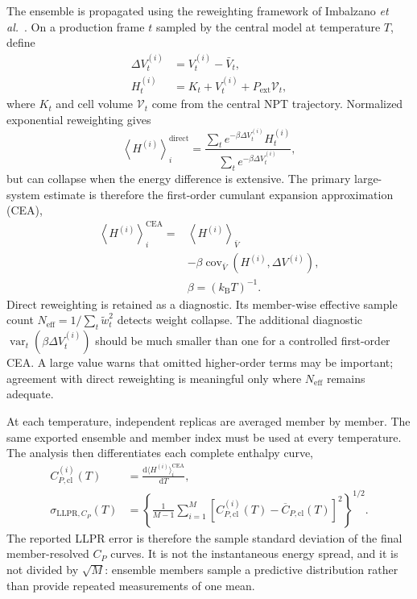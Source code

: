\documentclass[10pt,a4paper,twocolumn]{article}
\begin{document}
The ensemble is propagated using the reweighting framework of Imbalzano
\emph{et al.}\ \cite{imbalzano2021}. On a production frame $t$ sampled by the
central model at temperature $T$, define
\begin{align}
  \Delta V_t^{(i)} &= V_t^{(i)}-\bar V_t,\\
  H_t^{(i)} &= K_t+V_t^{(i)}+P_{\mathrm{ext}}\mathcal V_t,
  \label{eq:llpr-frame-enthalpy}
\end{align}
where $K_t$ and cell volume $\mathcal V_t$ come from the central NPT
trajectory. Normalized exponential reweighting gives
\begin{equation}
  \left\langle H^{(i)}\right\rangle_i^{\mathrm{direct}}
  =\frac{\sum_t e^{-\beta\Delta V_t^{(i)}}H_t^{(i)}}
  {\sum_t e^{-\beta\Delta V_t^{(i)}}},
  \label{eq:llpr-direct}
\end{equation}
but can collapse when the energy difference is extensive. The primary
large-system estimate is therefore the first-order cumulant expansion
approximation (CEA),
\begin{equation}
  \begin{aligned}
  \left\langle H^{(i)}\right\rangle_i^{\mathrm{CEA}}
  ={}&\left\langle H^{(i)}\right\rangle_{\bar V}
  \\
  &-\beta\operatorname{cov}_{\bar V}
  \left(H^{(i)},\Delta V^{(i)}\right),
  \\
  &\beta=(k_{\mathrm B}T)^{-1}.
  \end{aligned}
  \label{eq:llpr-cea}
\end{equation}
Direct reweighting is retained as a diagnostic. Its member-wise effective
sample count $N_{\mathrm{eff}}=1/\sum_t\widetilde w_t^2$ detects weight
collapse. The additional diagnostic
$\operatorname{var}_{t}(\beta\Delta V_t^{(i)})$ should be much smaller than
one for a controlled first-order CEA. A large value warns that omitted
higher-order terms may be important; agreement with direct reweighting is
meaningful only where $N_{\mathrm{eff}}$ remains adequate.

At each temperature, independent replicas are averaged member by member. The
same exported ensemble and member index must be used at every temperature.
The analysis then differentiates each complete enthalpy curve,
\begin{equation}
  \begin{aligned}
  C_{P,\mathrm{cl}}^{(i)}(T)
  &=\frac{\mathrm d\langle H^{(i)}\rangle_i^{\mathrm{CEA}}}
          {\mathrm dT},
  \\
  \sigma_{\mathrm{LLPR},C_P}(T)
  &=\left\{\frac{1}{M-1}\sum_{i=1}^{M}
  \left[C_{P,\mathrm{cl}}^{(i)}(T)
  -\overline C_{P,\mathrm{cl}}(T)\right]^2\right\}^{1/2}.
  \end{aligned}
  \label{eq:llpr-cp-spread}
\end{equation}
The reported LLPR error is therefore the sample standard deviation of the
final member-resolved $C_P$ curves. It is not the instantaneous energy spread,
and it is not divided by $\sqrt M$: ensemble members sample a predictive
distribution rather than provide repeated measurements of one mean.
\end{document}
